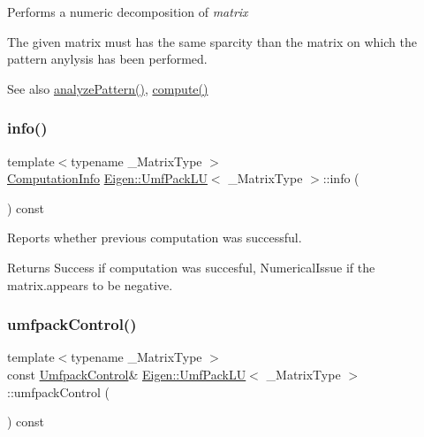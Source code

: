 Performs a numeric decomposition of {\itshape matrix} 

The given matrix must has the same sparcity than the matrix on which the pattern anylysis has been performed.

\begin{DoxySeeAlso}{See also}
\mbox{\hyperlink{class_eigen_1_1_umf_pack_l_u_ac7ea28b2017d6b26b7b08497f294e5e6}{analyze\+Pattern()}}, \mbox{\hyperlink{class_eigen_1_1_umf_pack_l_u_a05fb2b5717ebd67e46b83439721ceee7}{compute()}} 
\end{DoxySeeAlso}
\mbox{\label{class_eigen_1_1_umf_pack_l_u_a68738a0d99c67316877706f98b033402}} 
\subsubsection{\texorpdfstring{info()}{info()}}
{\footnotesize\ttfamily template$<$typename \+\_\+\+Matrix\+Type $>$ \\
\mbox{\hyperlink{group__enums_ga85fad7b87587764e5cf6b513a9e0ee5e}{Computation\+Info}} \mbox{\hyperlink{class_eigen_1_1_umf_pack_l_u}{Eigen\+::\+Umf\+Pack\+LU}}$<$ \+\_\+\+Matrix\+Type $>$\+::info (\begin{DoxyParamCaption}{ }\end{DoxyParamCaption}) const\hspace{0.3cm}{\ttfamily [inline]}}



Reports whether previous computation was successful. 

\begin{DoxyReturn}{Returns}
{\ttfamily Success} if computation was succesful, {\ttfamily Numerical\+Issue} if the matrix.\+appears to be negative. 
\end{DoxyReturn}
\mbox{\label{class_eigen_1_1_umf_pack_l_u_ae83d178202f3d44c1789c1c93842bf2e}} 
\subsubsection{\texorpdfstring{umfpackControl()}{umfpackControl()}\hspace{0.1cm}{\footnotesize\ttfamily [1/2]}}
{\footnotesize\ttfamily template$<$typename \+\_\+\+Matrix\+Type $>$ \\
const \mbox{\hyperlink{class_eigen_1_1_array}{Umfpack\+Control}}\& \mbox{\hyperlink{class_eigen_1_1_umf_pack_l_u}{Eigen\+::\+Umf\+Pack\+LU}}$<$ \+\_\+\+Matrix\+Type $>$\+::umfpack\+Control (\begin{DoxyParamCaption}{ }\end{DoxyParamCaption}) const\hspace{0.3cm}{\ttfamily [inline]}}

